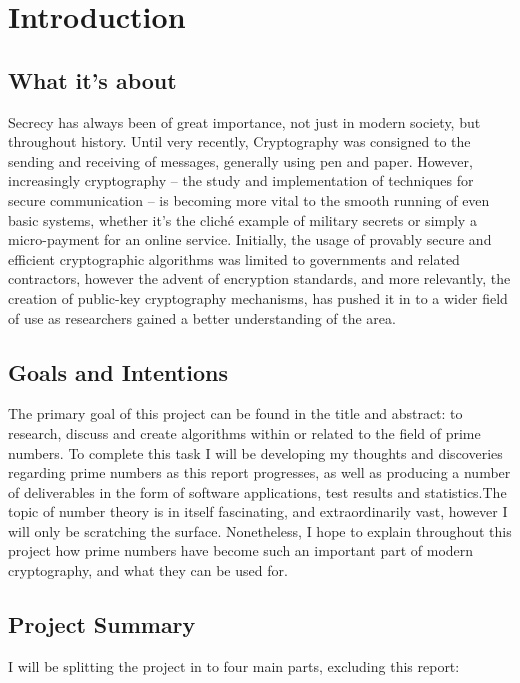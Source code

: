 \chapter{Introduction}
\label{Chapter1}

\section{What it's about}

Secrecy has always been of great importance, not just in modern society, but throughout history. Until very recently, Cryptography was consigned to the sending and receiving of messages, generally using pen and paper. However, increasingly cryptography -- the study and implementation of techniques for secure communication -- is becoming more vital to the smooth running of even basic systems, whether it's the clich\'{e} example of military secrets or simply a micro-payment for an online service. Initially, the usage of provably secure and efficient cryptographic algorithms was limited to governments and related contractors, however the advent of encryption standards, and more relevantly, the creation of public-key cryptography mechanisms, has pushed it in to a wider field of use as researchers gained a better understanding of the area. 

\section{Goals and Intentions}

The primary goal of this project can be found in the title and abstract: to research, discuss and create algorithms within or related to the field of prime numbers. To complete this task I will be developing my thoughts and discoveries regarding prime numbers as this report progresses, as well as producing a number of deliverables in the form of software applications, test results and statistics.The topic of number theory is in itself fascinating, and extraordinarily vast, however I will only be scratching the surface. Nonetheless, I hope to explain throughout this project how prime numbers have become such an important part of modern cryptography, and what they can be used for.

\section{Project Summary}

I will be splitting the project in to four main parts, excluding this report:

